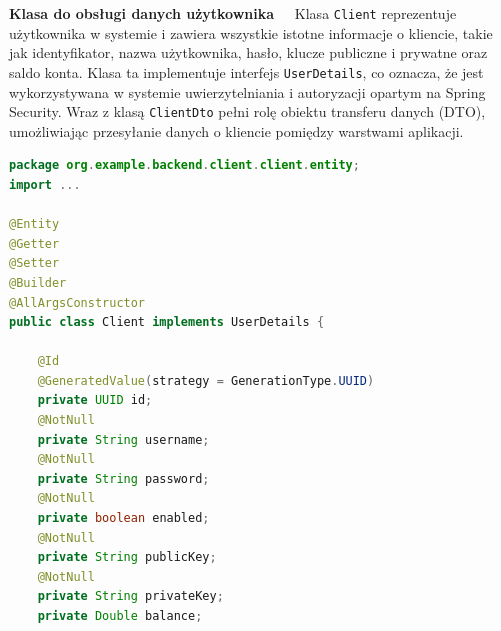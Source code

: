 \noindent \textbf{Klasa do obsługi danych użytkownika~~}
Klasa \texttt{Client} reprezentuje użytkownika w systemie i zawiera wszystkie istotne informacje o kliencie, takie jak identyfikator, nazwa użytkownika, hasło, klucze publiczne i prywatne oraz saldo konta. Klasa ta implementuje interfejs \texttt{UserDetails}, co oznacza, że jest wykorzystywana w systemie uwierzytelniania i autoryzacji opartym na Spring Security. Wraz z klasą \texttt{ClientDto} pełni rolę obiektu transferu danych (DTO), umożliwiając przesyłanie danych o kliencie pomiędzy warstwami aplikacji.\\[-10pt]
\begin{lstlisting}[language=Java, style=JavaStyle]
package org.example.backend.client.client.entity;
import ...

@Entity
@Getter
@Setter
@Builder
@AllArgsConstructor
public class Client implements UserDetails {

	@Id
	@GeneratedValue(strategy = GenerationType.UUID)
	private UUID id;
	@NotNull
	private String username;
	@NotNull
	private String password;
	@NotNull
	private boolean enabled;
	@NotNull
	private String publicKey;
	@NotNull
	private String privateKey;
	private Double balance;
\end{lstlisting}

